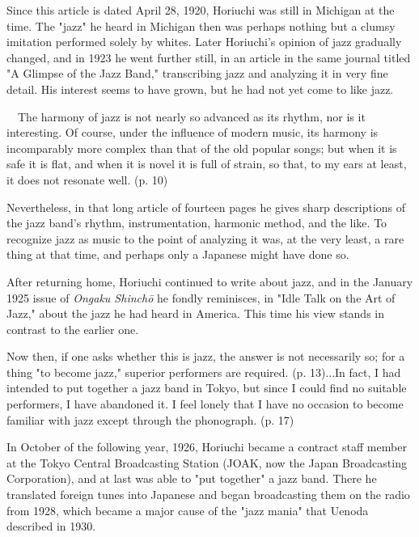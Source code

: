 Since this article is dated April 28, 1920, Horiuchi was still in Michigan at the time. The "jazz" he heard in Michigan then was perhaps nothing but a clumsy imitation performed solely by whites. Later Horiuchi's opinion of jazz gradually changed, and in 1923 he went further still, in an article in the same journal titled "A Glimpse of the Jazz Band," transcribing jazz and analyzing it in very fine detail. His interest seems to have grown, but he had not yet come to like jazz.

\begin{gquote}
　The harmony of jazz is not nearly so advanced as its rhythm, nor is it interesting. Of course, under the influence of modern music, its harmony is incomparably more complex than that of the old popular songs; but when it is safe it is flat, and when it is novel it is full of strain, so that, to my ears at least, it does not resonate well. (p. 10)
\end{gquote}

Nevertheless, in that long article of fourteen pages he gives sharp descriptions of the jazz band's rhythm, instrumentation, harmonic method, and the like. To recognize jazz as music to the point of analyzing it was, at the very least, a rare thing at that time, and perhaps only a Japanese might have done so.

After returning home, Horiuchi continued to write about jazz, and in the January 1925 issue of \textit{Ongaku Shinchō} he fondly reminisces, in "Idle Talk on the Art of Jazz," about the jazz he had heard in America. This time his view stands in contrast to the earlier one.

\begin{gquote}
Now then, if one asks whether this is jazz, the answer is not necessarily so; for a thing "to become jazz," superior performers are required. (p. 13)...In fact, I had intended to put together a jazz band in Tokyo, but since I could find no suitable performers, I have abandoned it. I feel lonely that I have no occasion to become familiar with jazz except through the phonograph. (p. 17)
\end{gquote}

In October of the following year, 1926, Horiuchi became a contract staff member at the Tokyo Central Broadcasting Station (JOAK, now the Japan Broadcasting Corporation), and at last was able to "put together" a jazz band. There he translated foreign tunes into Japanese and began broadcasting them on the radio from 1928, which became a major cause of the "jazz mania" that Uenoda described in 1930.

